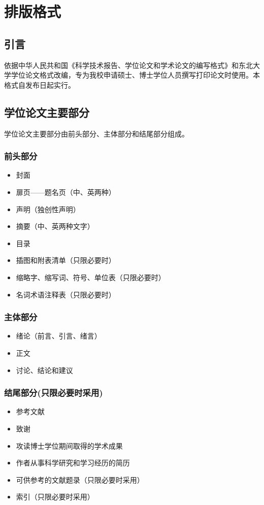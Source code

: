 \chapter{排版格式}\label{chap:format}

\section{引言}
依据中华人民共和国《科学技术报告、学位论文和学术论文的编写格式》和东北大学学位论文格式改编，专为我校申请硕士、博士学位人员撰写打印论文时使用。本格式自发布日起实行。
\section{学位论文主要部分}
学位论文主要部分由前头部分、主体部分和结尾部分组成。
\subsection{前头部分}
\begin{itemize}
    \item 封面
    \item 扉页——题名页（中、英两种）
    \item 声明（独创性声明）
    \item 摘要（中、英两种文字）
    \item 目录
    \item 插图和附表清单（只限必要时）
    \item 缩略字、缩写词、符号、单位表（只限必要时）
    \item 名词术语注释表（只限必要时）
\end{itemize}

\subsection{主体部分}
\begin{itemize}
    \item 绪论（前言、引言、绪言）
    \item 正文
    \item 讨论、结论和建议
\end{itemize}
\subsection{结尾部分(只限必要时采用)}
\begin{itemize}
    \item 参考文献
    \item 致谢
    \item 攻读博士学位期间取得的学术成果
    \item 作者从事科学研究和学习经历的简历
    \item 可供参考的文献题录（只限必要时采用）
    \item 索引（只限必要时采用）
\end{itemize}

